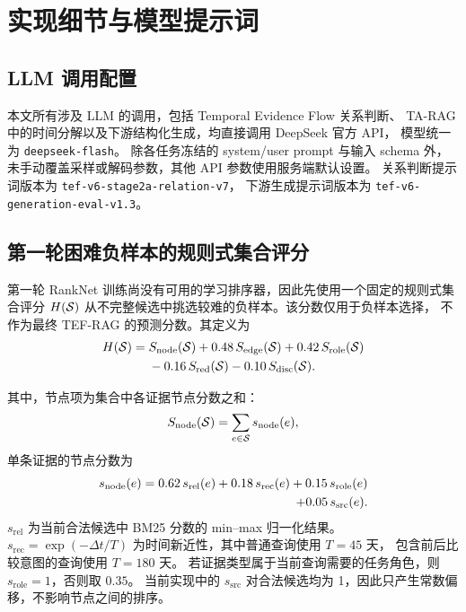 \section{实现细节与模型提示词}
\label{app:implementation}

\subsection{LLM 调用配置}
\label{app:llm_config}

本文所有涉及 LLM 的调用，包括 Temporal Evidence Flow 关系判断、
TA-RAG 中的时间分解以及下游结构化生成，均直接调用 DeepSeek 官方 API，
模型统一为 \texttt{deepseek-flash}。
除各任务冻结的 system/user prompt 与输入 schema 外，
未手动覆盖采样或解码参数，其他 API 参数使用服务端默认设置。
关系判断提示词版本为 \texttt{tef-v6-stage2a-relation-v7}，
下游生成提示词版本为 \texttt{tef-v6-generation-eval-v1.3}。


\subsection{第一轮困难负样本的规则式集合评分}
\label{app:hand_score}

第一轮 RankNet 训练尚没有可用的学习排序器，因此先使用一个固定的规则式集合评分
$H(\mathcal{S})$ 从不完整候选中挑选较难的负样本。该分数仅用于负样本选择，
不作为最终 TEF-RAG 的预测分数。其定义为
\begin{equation}
\begin{aligned}
H(\mathcal{S})
={}&S_{\mathrm{node}}(\mathcal{S})
+0.48\,S_{\mathrm{edge}}(\mathcal{S})
+0.42\,S_{\mathrm{role}}(\mathcal{S})\\
&-0.16\,S_{\mathrm{red}}(\mathcal{S})
-0.10\,S_{\mathrm{disc}}(\mathcal{S}).
\end{aligned}
\label{eq:appendix_hand_score}
\end{equation}

其中，节点项为集合中各证据节点分数之和：
\begin{equation}
S_{\mathrm{node}}(\mathcal{S})
=
\sum_{e\in\mathcal{S}}s_{\mathrm{node}}(e),
\end{equation}
单条证据的节点分数为
\begin{align}
s_{\mathrm{node}}(e)
=
0.62\,s_{\mathrm{rel}}(e)
+0.18\,s_{\mathrm{rec}}(e)
+0.15\,s_{\mathrm{role}}(e) \\
+0.05\,s_{\mathrm{src}}(e). \notag
\end{align}
$s_{\mathrm{rel}}$ 为当前合法候选中 BM25 分数的 min--max 归一化结果。
$s_{\mathrm{rec}}=\exp(-\Delta t/T)$ 为时间新近性，其中普通查询使用 $T=45$ 天，
包含前后比较意图的查询使用 $T=180$ 天。
若证据类型属于当前查询需要的任务角色，则 $s_{\mathrm{role}}=1$，否则取 $0.35$。
当前实现中的 $s_{\mathrm{src}}$ 对合法候选均为 1，因此只产生常数偏移，不影响节点之间的排序。

